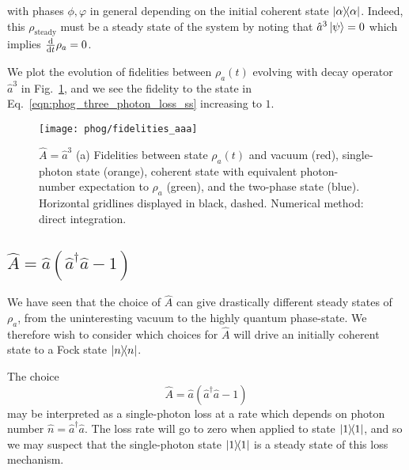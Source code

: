 \noindent with phases $\phi, \varphi$ in general depending on the initial coherent state $\dyad{\alpha}$. %
Indeed, this $\rho_{\text{steady}}$ must be a steady state of the system by noting that $\hat{a}^3 \ket{\psi} = 0$ which implies $\frac{\mathrm{d}}{\mathrm{d}t} \rho_a = 0$.

We plot the evolution of fidelities between $\rho_a\left(t\right)$ evolving with decay operator $\hat{a}^3$ in Fig.~\ref{fig:phog_lindblad_three_photon_loss}, and we see the fidelity to the state in Eq.~\ref{eqn:phog_three_photon_loss_ss} increasing to $1$. 

\begin{figure}[htp]
\centering
\texttt{[image: phog/fidelities\_aaa]}
\caption{\label{fig:phog_lindblad_three_photon_loss}$\hat{A} = \hat{a}^3$ (a) Fidelities between state $\rho_a\left(t\right)$ and vacuum (red), single-photon state (orange), coherent state with equivalent photon-number expectation to $\rho_a$ (green), and the two-phase state (blue).  Horizontal gridlines displayed in black, dashed. Numerical method: direct integration.}
\end{figure}
\fi

\FloatBarrier
\subsection{$\hat{A} = \hat{a}\left(\hat{a}^\dagger \hat{a} - 1\right)$}\label{sec:A_ncl}
We have seen that the choice of $\hat{A}$ can give drastically different steady states of $\rho_a$,  from the uninteresting vacuum to the highly quantum phase-state. We therefore wish to consider which choices for $\hat{A}$ will drive an initially coherent state to a Fock state $\dyad{n}$. 

The choice 
\begin{equation}\label{eqn:phog_A_ncl}
\hat{A} = \hat{a}\left(\hat{a}^\dagger \hat{a} - 1\right)
\end{equation}
may be interpreted as a single-photon loss at a rate which depends on photon number $\hat{n} = \hat{a}^\dagger \hat{a}$. The loss rate will go to zero when applied to state $\dyad{1}$, and so we may suspect that the single-photon state $\dyad{1}$ is a steady state of this loss mechanism.


